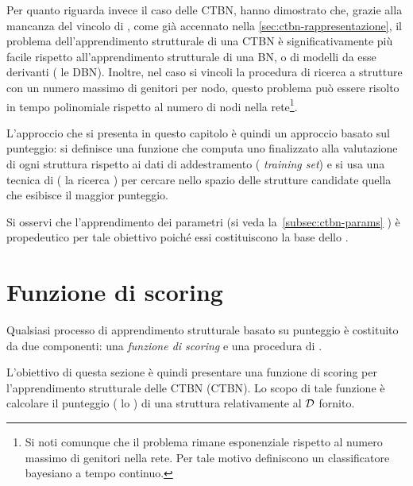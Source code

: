 Per quanto riguarda invece il caso delle \acs{CTBN}, \citet{Nodelman2002} hanno dimostrato che, grazie alla mancanza del vincolo di , come già accennato nella \autoref{sec:ctbn-rappresentazione}, il problema dell'apprendimento strutturale di una \acs{CTBN} è significativamente più facile rispetto all'apprendimento strutturale di una \acl{BN}, o di modelli da esse derivanti (\eg{} le \acf{DBN}). Inoltre, nel caso si vincoli la procedura di ricerca a strutture con un numero massimo di genitori per nodo, questo problema può essere risolto in tempo polinomiale rispetto al numero di nodi nella rete\footnote{Si noti comunque che il problema rimane esponenziale rispetto al numero massimo di genitori nella rete. Per tale motivo \citet{Stella2012} definiscono un classificatore bayesiano a tempo continuo.}.

L'approccio che si presenta in questo capitolo è quindi un approccio basato sul punteggio: si definisce una funzione che computa uno \emph{} finalizzato alla valutazione di ogni struttura rispetto ai dati di addestramento (\ie{} \emph{training set}) e si usa una tecnica di  (\eg{} la ricerca \emph{\hc{}}) per cercare nello spazio delle strutture candidate quella che esibisce il maggior punteggio.

Si osservi che l'apprendimento dei parametri (si veda la~\autoref{subsec:ctbn-params} ) è propedeutico per tale obiettivo poiché essi costituiscono la base dello .

\section{Funzione di scoring}\label{sec:ctbn-structurallearning-score}
Qualsiasi processo di apprendimento strutturale basato su punteggio è costituito da due componenti: una \emph{funzione di scoring} e una procedura di .

L'obiettivo di questa sezione è quindi presentare una funzione di scoring per l'apprendimento strutturale delle \acl{CTBN} (\acs{CTBN}). Lo scopo di tale funzione è calcolare il punteggio (\ie{} lo ) di una struttura relativamente al \emph{} $\mathcal{D}$ fornito.

